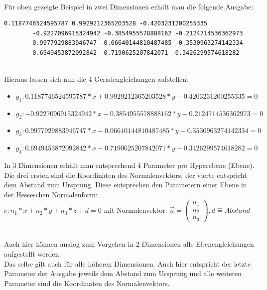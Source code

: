 \documentclass[12pt]{scrartcl}
\begin{document}
\ \\

Für oben gezeigte Beispiel in zwei Dimensionen erhält man die folgende Ausgabe:
\begin{lstlisting}[style=Terminal, caption={Ausgabe von qconvex mit Option 'n'},captionpos=b]
        0.1187746524595787 0.9929212365203528 -0.4203231200255335 
        -0.9227096915324942 -0.3854955578888162 -0.2124714536362973 
        0.9977929883946747 -0.06640144810487485 -0.3530963274142334 
        0.6949453872092842 -0.7190625207842071 -0.3426299574618282 
\end{lstlisting}

\ \\
 
Hieraus lassen sich nun die 4 Geradengleichungen aufstellen:
\begin{itemize}
    \item $g_1: 0.1187746524595787*x + 0.9929212365203528*y - 0.4203231200255335 = 0 $
    \item $g_2: -0.9227096915324942*x - 0.3854955578888162*y - 0.2124714536362973 = 0 $
    \item $g_3: 0.9977929883946747*x - 0.06640144810487485*y - 0.3530963274142334 = 0 $
    \item $g_4: 0.6949453872092842*x - 0.7190625207842071*y - 0.3426299574618282 = 0 $
\end{itemize}


In 3 Dimensionen erhält man entsprechend 4 Parameter pro Hyperebene (Ebene). Die drei ersten sind die Koordinaten des Normalenvektors, der vierte entspricht dem Abstand zum Ursprung. Diese entsprechen den Parametern einer Ebene in der Hesseschen Normalenform:\\

$ e: n_1*x+n_2*y+n_3*z+d = 0 $ mit Normalenvektor: $\vec{n} = \begin{pmatrix}n_1 \\ n_2 \\ n_3\end{pmatrix}, d \widehat{=} Abstand$

\ \\
Auch hier können analog zum Vorgehen in 2 Dimensionen alle Ebenengleichungen aufgestellt werden.\\
Das selbe gilt auch für alle höheren Dimensionen. Auch hier entspricht der letzte Parameter der Ausgabe jeweils dem Abstand zum Ursprung und alle weiteren Parameter sind die Koordinaten des Normalenvektors.\\
\end{document}
